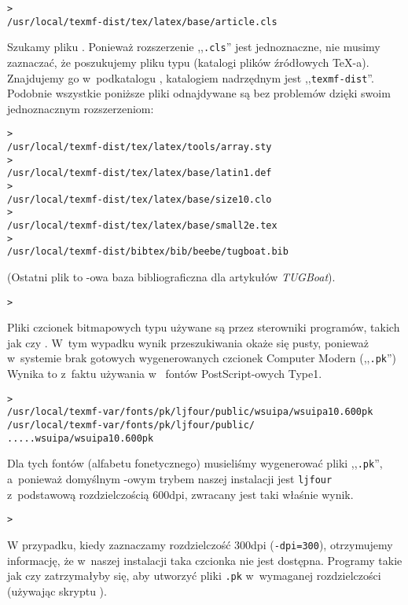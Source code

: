 \documentclass{article}
\let\textsl\textit
\renewcommand{\samp}[1]{,,\texttt{#1}''}  %
\begin{document}
\begin{alltt}
> 
/usr/local/texmf-dist/tex/latex/base/article.cls
\end{alltt}
Szukamy  pliku .
Ponieważ rozszerzenie \samp{.cls} jest jednoznaczne, nie musimy zaznaczać, że
poszukujemy pliku typu  (katalogi plików źródłowych \TeX-a).
Znajdujemy go w~podkatalogu ,  katalogiem nadrzędnym jest
\samp{texmf-dist}.
Podobnie wszystkie poniższe pliki odnajdywane są bez problemów
dzięki swoim jednoznacznym rozszerzeniom:
\begin{alltt}
> 
/usr/local/texmf-dist/tex/latex/tools/array.sty
> 
/usr/local/texmf-dist/tex/latex/base/latin1.def
> 
/usr/local/texmf-dist/tex/latex/base/size10.clo
> 
/usr/local/texmf-dist/tex/latex/base/small2e.tex
> 
/usr/local/texmf-dist/bibtex/bib/beebe/tugboat.bib
\end{alltt}

\noindent (Ostatni plik to \BibTeX-owa baza bibliograficzna dla artykułów
\textsl{TUGBoat}).

\begin{alltt}
> 
\end{alltt}
Pliki czcionek bitmapowych typu  używane są przez sterowniki programów,
 takich jak  czy .
W~tym wypadku wynik przeszukiwania okaże się  pusty, ponieważ
w~systemie brak gotowych wygenerowanych czcionek Computer Modern (\samp{.pk})
Wynika to z~faktu używania w~\TL{} fontów PostScript-owych Type1.
\begin{alltt}
> 
\ifSingleColumn   /usr/local/texmf-var/fonts/pk/ljfour/public/wsuipa/wsuipa10.600pk
\else /usr/local/texmf-var/fonts/pk/ljfour/public/
.....                         wsuipa/wsuipa10.600pk
\fi\end{alltt}
Dla tych fontów (alfabetu fonetycznego) musieliśmy wygenerować pliki
\samp{.pk}, a~ponieważ domyślnym \MF{}-owym trybem naszej instalacji jest
\texttt{ljfour} z~podstawową rozdzielczością 600dpi, zwracany jest taki
właśnie wynik.
\begin{alltt}
> 
\end{alltt}
W przypadku, kiedy zaznaczamy  rozdzielczość
300dpi (\texttt{-dpi=300}), otrzymujemy informację, że w~naszej instalacji taka
czcionka nie jest dostępna.
Programy takie jak  czy  zatrzymałyby się, aby
utworzyć pliki \texttt{.pk} w~wymaganej rozdzielczości (używając skryptu
).
\end{document}
